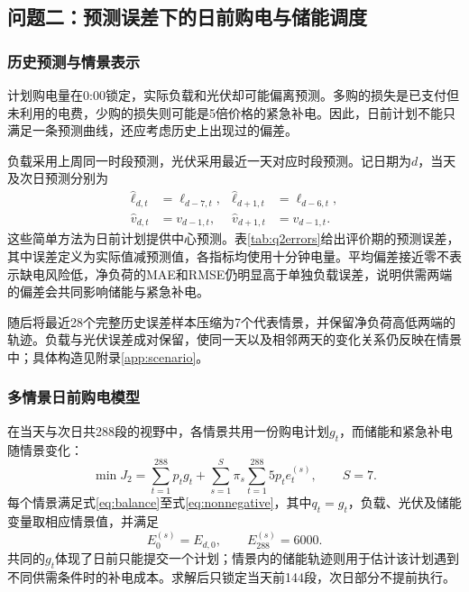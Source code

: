 \subsection{问题二：预测误差下的日前购电与储能调度}
\subsubsection{历史预测与情景表示}
计划购电量在0:00锁定，实际负载和光伏却可能偏离预测。多购的损失是已支付但未利用的电费，少购的损失则可能是5倍价格的紧急补电。因此，日前计划不能只满足一条预测曲线，还应考虑历史上出现过的偏差。

负载采用上周同一时段预测，光伏采用最近一天对应时段预测。记日期为$d$，当天及次日预测分别为
\begin{align}
\widehat\ell_{d,t}&=\ell_{d-7,t},&\widehat\ell_{d+1,t}&=\ell_{d-6,t},\\
\widehat v_{d,t}&=v_{d-1,t},&\widehat v_{d+1,t}&=v_{d-1,t}.
\end{align}
这些简单方法为日前计划提供中心预测。表\ref{tab:q2errors}给出评价期的预测误差，其中误差定义为实际值减预测值，各指标均使用十分钟电量。平均偏差接近零不表示缺电风险低，净负荷的MAE和RMSE仍明显高于单独负载误差，说明供需两端的偏差会共同影响储能与紧急补电。
\begin{table}[htbp]\centering\small
\caption{问题二预测误差统计（单位：kWh）}\label{tab:q2errors}

\end{table}
随后将最近28个完整历史误差样本压缩为7个代表情景，并保留净负荷高低两端的轨迹。负载与光伏误差成对保留，使同一天以及相邻两天的变化关系仍反映在情景中；具体构造见附录\ref{app:scenario}。

\subsubsection{多情景日前购电模型}
在当天与次日共288段的视野中，各情景共用一份购电计划$g_t$，而储能和紧急补电随情景变化：
\begin{equation}
\min J_2=\sum_{t=1}^{288}p_tg_t+
\sum_{s=1}^{S}\pi_s\sum_{t=1}^{288}5p_te_t^{(s)},\qquad S=7.
\label{eq:q2objective}
\end{equation}
每个情景满足式\eqref{eq:balance}至式\eqref{eq:nonnegative}，其中$q_t=g_t$，负载、光伏及储能变量取相应情景值，并满足
\begin{equation}
E_0^{(s)}=E_{d,0},\qquad E_{288}^{(s)}=6000.
\end{equation}
共同的$g_t$体现了日前只能提交一个计划；情景内的储能轨迹则用于估计该计划遇到不同供需条件时的补电成本。求解后只锁定当天前144段，次日部分不提前执行。

